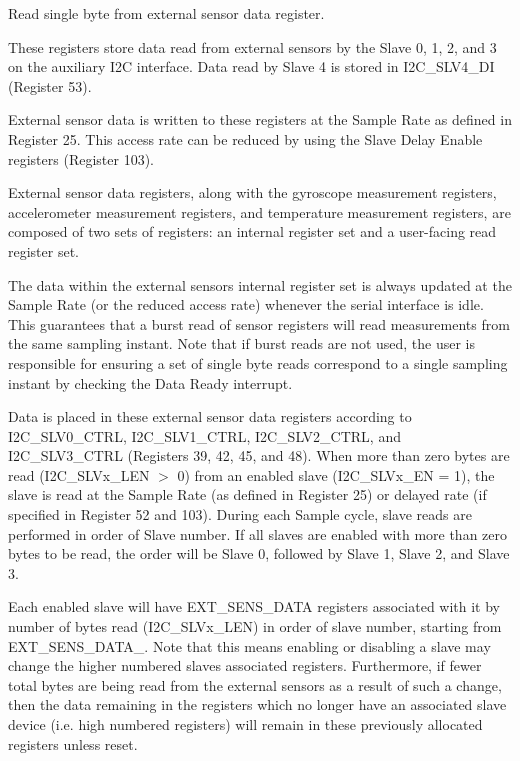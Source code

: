 Read single byte from external sensor data register. 

These registers store data read from external sensors by the Slave 0, 1, 2, and 3 on the auxiliary I2C interface. Data read by Slave 4 is stored in I2\+C\+\_\+\+S\+L\+V4\+\_\+\+DI (Register 53).

External sensor data is written to these registers at the Sample Rate as defined in Register 25. This access rate can be reduced by using the Slave Delay Enable registers (Register 103).

External sensor data registers, along with the gyroscope measurement registers, accelerometer measurement registers, and temperature measurement registers, are composed of two sets of registers\+: an internal register set and a user-\/facing read register set.

The data within the external sensors\textquotesingle{} internal register set is always updated at the Sample Rate (or the reduced access rate) whenever the serial interface is idle. This guarantees that a burst read of sensor registers will read measurements from the same sampling instant. Note that if burst reads are not used, the user is responsible for ensuring a set of single byte reads correspond to a single sampling instant by checking the Data Ready interrupt.

Data is placed in these external sensor data registers according to I2\+C\+\_\+\+S\+L\+V0\+\_\+\+C\+T\+RL, I2\+C\+\_\+\+S\+L\+V1\+\_\+\+C\+T\+RL, I2\+C\+\_\+\+S\+L\+V2\+\_\+\+C\+T\+RL, and I2\+C\+\_\+\+S\+L\+V3\+\_\+\+C\+T\+RL (Registers 39, 42, 45, and 48). When more than zero bytes are read (I2\+C\+\_\+\+S\+L\+Vx\+\_\+\+L\+EN $>$ 0) from an enabled slave (I2\+C\+\_\+\+S\+L\+Vx\+\_\+\+EN = 1), the slave is read at the Sample Rate (as defined in Register 25) or delayed rate (if specified in Register 52 and 103). During each Sample cycle, slave reads are performed in order of Slave number. If all slaves are enabled with more than zero bytes to be read, the order will be Slave 0, followed by Slave 1, Slave 2, and Slave 3.

Each enabled slave will have E\+X\+T\+\_\+\+S\+E\+N\+S\+\_\+\+D\+A\+TA registers associated with it by number of bytes read (I2\+C\+\_\+\+S\+L\+Vx\+\_\+\+L\+EN) in order of slave number, starting from E\+X\+T\+\_\+\+S\+E\+N\+S\+\_\+\+D\+A\+T\+A\+\_. Note that this means enabling or disabling a slave may change the higher numbered slaves\textquotesingle{} associated registers. Furthermore, if fewer total bytes are being read from the external sensors as a result of such a change, then the data remaining in the registers which no longer have an associated slave device (i.\+e. high numbered registers) will remain in these previously allocated registers unless reset.

